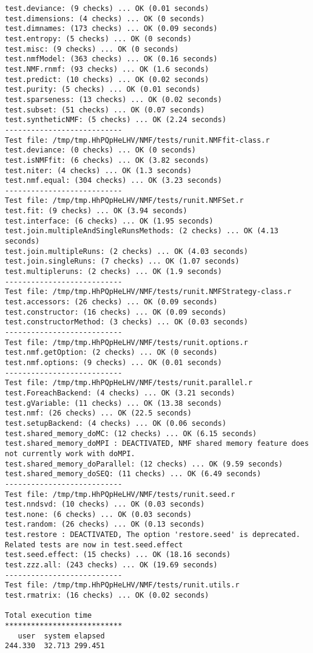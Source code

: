 \documentclass[10pt]{article}
\begin{document}
\begin{verbatim}
test.deviance: (9 checks) ... OK (0.01 seconds)
test.dimensions: (4 checks) ... OK (0 seconds)
test.dimnames: (173 checks) ... OK (0.09 seconds)
test.entropy: (5 checks) ... OK (0 seconds)
test.misc: (9 checks) ... OK (0 seconds)
test.nmfModel: (363 checks) ... OK (0.16 seconds)
test.NMF.rnmf: (93 checks) ... OK (1.6 seconds)
test.predict: (10 checks) ... OK (0.02 seconds)
test.purity: (5 checks) ... OK (0.01 seconds)
test.sparseness: (13 checks) ... OK (0.02 seconds)
test.subset: (51 checks) ... OK (0.07 seconds)
test.syntheticNMF: (5 checks) ... OK (2.24 seconds)
--------------------------- 
Test file: /tmp/tmp.HhPQpHeLHV/NMF/tests/runit.NMFfit-class.r 
test.deviance: (0 checks) ... OK (0 seconds)
test.isNMFfit: (6 checks) ... OK (3.82 seconds)
test.niter: (4 checks) ... OK (1.3 seconds)
test.nmf.equal: (304 checks) ... OK (3.23 seconds)
--------------------------- 
Test file: /tmp/tmp.HhPQpHeLHV/NMF/tests/runit.NMFSet.r 
test.fit: (9 checks) ... OK (3.94 seconds)
test.interface: (6 checks) ... OK (1.95 seconds)
test.join.multipleAndSingleRunsMethods: (2 checks) ... OK (4.13 seconds)
test.join.multipleRuns: (2 checks) ... OK (4.03 seconds)
test.join.singleRuns: (7 checks) ... OK (1.07 seconds)
test.multipleruns: (2 checks) ... OK (1.9 seconds)
--------------------------- 
Test file: /tmp/tmp.HhPQpHeLHV/NMF/tests/runit.NMFStrategy-class.r 
test.accessors: (26 checks) ... OK (0.09 seconds)
test.constructor: (16 checks) ... OK (0.09 seconds)
test.constructorMethod: (3 checks) ... OK (0.03 seconds)
--------------------------- 
Test file: /tmp/tmp.HhPQpHeLHV/NMF/tests/runit.options.r 
test.nmf.getOption: (2 checks) ... OK (0 seconds)
test.nmf.options: (9 checks) ... OK (0.01 seconds)
--------------------------- 
Test file: /tmp/tmp.HhPQpHeLHV/NMF/tests/runit.parallel.r 
test.ForeachBackend: (4 checks) ... OK (3.21 seconds)
test.gVariable: (11 checks) ... OK (13.38 seconds)
test.nmf: (26 checks) ... OK (22.5 seconds)
test.setupBackend: (4 checks) ... OK (0.06 seconds)
test.shared_memory_doMC: (12 checks) ... OK (6.15 seconds)
test.shared_memory_doMPI : DEACTIVATED, NMF shared memory feature does not currently work with doMPI.
test.shared_memory_doParallel: (12 checks) ... OK (9.59 seconds)
test.shared_memory_doSEQ: (11 checks) ... OK (6.49 seconds)
--------------------------- 
Test file: /tmp/tmp.HhPQpHeLHV/NMF/tests/runit.seed.r 
test.nndsvd: (10 checks) ... OK (0.03 seconds)
test.none: (6 checks) ... OK (0.03 seconds)
test.random: (26 checks) ... OK (0.13 seconds)
test.restore : DEACTIVATED, The option 'restore.seed' is deprecated. Related tests are now in test.seed.effect
test.seed.effect: (15 checks) ... OK (18.16 seconds)
test.zzz.all: (243 checks) ... OK (19.69 seconds)
--------------------------- 
Test file: /tmp/tmp.HhPQpHeLHV/NMF/tests/runit.utils.r 
test.rmatrix: (16 checks) ... OK (0.02 seconds)

Total execution time
***************************
   user  system elapsed 
244.330  32.713 299.451 

\end{verbatim}
\end{document}
